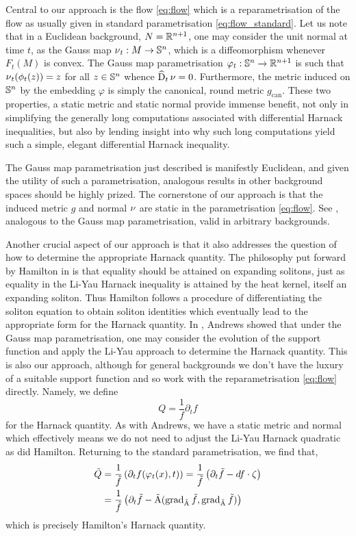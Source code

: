 \documentclass{amsart}
\begin{document}
Central to our approach is the flow \eqref{eq:flow} which is a reparametrisation of the flow as usually given in standard parametrisation \eqref{eq:flow_standard}. Let us note that in a Euclidean background, $N = \mathbb{R}^{n+1}$, one may consider the unit normal at time $t$, as the Gauss map $\operatorname{\nu}_t : M \to \mathbb{S}^n$, which is a diffeomorphism whenever $F_t(M)$ is convex. The Gauss map parametrisation $\varphi_t: \mathbb{S}^n \to \mathbb{R}^{n+1}$ \cite{MR1296393} is such that $\operatorname{\nu}_t(\phi_t(z)) = z$ for all $z \in \mathbb{S}^n$ whence $\operatorname{\widehat{D}}_t \operatorname{\nu} = 0$. Furthermore, the metric induced on $\mathbb{S}^n$ by the embedding $\varphi$ is simply the canonical, round metric $g_{\operatorname{can}}$. These two properties, a static metric and static normal provide immense benefit, not only in simplifying the generally long computations associated with differential Harnack inequalities, but also by lending insight into why such long computations yield such a simple, elegant differential Harnack inequality.

The Gauss map parametrisation just described is manifestly Euclidean, and given the utility of such a parametrisation, analogous results in other background spaces should be highly prized. The cornerstone of our approach is that the induced metric \(g\) and normal \(\operatorname{\nu}\) are static in the parametrisation \eqref{eq:flow}. See , analogous to the Gauss map parametrisation, valid in arbitrary backgrounds.

Another crucial aspect of our approach is that it also addresses the question of how to determine the appropriate Harnack quantity. The philosophy put forward by Hamilton in \cite{MR1316556,MR1198607} is that equality should be attained on expanding solitons, just as equality in the Li-Yau Harnack inequality \cite{MR834612} is attained by the heat kernel, itself an expanding soliton. Thus Hamilton follows a procedure of differentiating the soliton equation to obtain soliton identities which eventually lead to the appropriate form for the Harnack quantity. In \cite{MR1296393}, Andrews showed that under the Gauss map parametrisation, one may consider the evolution of the support function and apply the Li-Yau approach to determine the Harnack quantity. This is also our approach, although for general backgrounds we don't have the luxury of a suitable support function and so work with the reparametrisation \eqref{eq:flow} directly. Namely, we define
\begin{equation}
\label{eq:Q}
Q = \frac{1}{f} \partial_t f
\end{equation}
for the Harnack quantity. As with Andrews, we have a static metric and normal which effectively means we do not need to adjust the Li-Yau Harnack quadratic as did Hamilton. Returning to the standard parametrisation, we find that,
\[
\begin{split}
\tilde{Q} &= \frac{1}{\tilde{f}} \left(\partial_t f(\varphi_t(x), t)\right) = \frac{1}{\tilde{f}} \left(\partial_t \tilde{f} - df \cdot \operatorname{\zeta}\right) \\
&= \frac{1}{\tilde{f}} \left(\partial_t \tilde{f} - \tilde{\operatorname{A}}(\operatorname{grad}_{\tilde{\operatorname{A}}} \tilde{f}, \operatorname{grad}_{\tilde{\operatorname{A}}} \tilde{f})\right)
\end{split}
\]
which is precisely Hamilton's Harnack quantity.
\end{document}
